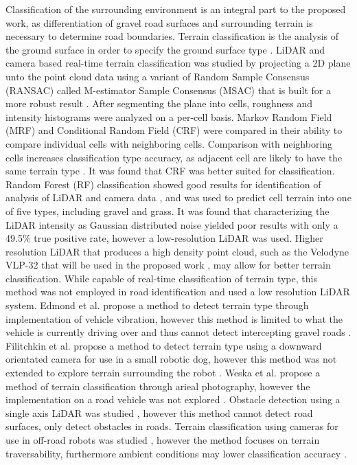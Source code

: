 \documentclass[journal,onecolumn]{IEEEtran}
\begin{document}
	{Classification of the surrounding environment is an integral part to the proposed work, as differentiation of gravel road surfaces and surrounding terrain is necessary to determine road boundaries. Terrain classification is the analysis of the ground surface in order to specify the ground surface type \cite{laible_3d_2012,laible_terrain_2013,laible_map_building,rasmussen_combining_2002,reymann_improving_2015,walas_terrain_2014,wietrzykowski_boosting_2014,wang_road_nodate}. LiDAR and camera based real-time terrain classification was studied by projecting a 2D plane unto the point cloud data using a variant of Random Sample Consensus (RANSAC) called M-estimator Sample Consensus (MSAC) \cite{mijakovska_generating_2014} that is built for a more robust result \cite{laible_3d_2012,laible_map_building,laible_terrain_2013}. After segmenting the plane into cells, roughness and intensity histograms were analyzed on a per-cell basis. Markov Random Field (MRF) \cite{chellappa_classification_1985} and Conditional Random Field (CRF) \cite{wallach_conditional_nodate} were compared in their ability to compare individual cells with neighboring cells. Comparison with neighboring cells increases classification type accuracy, as adjacent cell are likely to have the same terrain type \cite{haselich_terrain_2011,zhao_fusion_2014}. It was found that CRF was better suited for classification.	Random Forest (RF) classification showed good results for identification of analysis of LiDAR and camera data \cite{breiman_random_2001}, and was used to predict cell terrain into one of five types, including gravel and grass. It was found that characterizing the LiDAR intensity as Gaussian distributed noise yielded poor results with only a 49.5\% true positive rate, however a low-resolution LiDAR was used. Higher resolution LiDAR that produces a high density point cloud, such as the Velodyne VLP-32 that will be used in the proposed work \cite{vlp_32c}, may allow for better terrain classification. While capable of real-time classification of terrain type, this method was not employed in road identification and used a low resolution LiDAR system. Edmond et al. propose a method to detect terrain type through implementation of vehicle vibration, however this method is limited to what the vehicle is currently driving over and thus cannot detect intercepting gravel roads \cite{dupont_online_2008}. Filitchkin et al. propose a method to detect terrain type using a downward orientated camera for use in a small robotic dog, however this method was not extended to explore terrain surrounding the robot \cite{filitchkin_feature_based_2012}. Weska et al. propose a method of terrain classification through arieal photography, however the implementation on a road vehicle was not explored \cite{weszka_comparative_1976}. Obstacle detection using a single axis LiDAR was studied \cite{manduchi_obstacle_2005}, however this method cannot detect road surfaces, only detect obstacles in roads. Terrain classification using cameras for use in off-road robots was studied \cite{walch_offroad_2022}, however the method focuses on terrain traversability, furthermore ambient conditions may lower classification accuracy \cite{levi_3d_2012_light}. }
	
\end{document}
